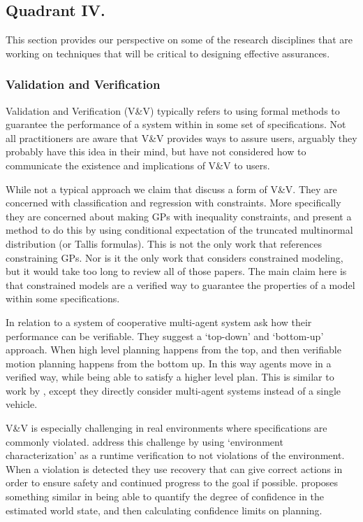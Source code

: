 \subsection{Quadrant IV.}\label{sec:q4}
This section provides our perspective on some of the research disciplines that are working on techniques that will be critical to designing effective assurances.

\subsubsection{Validation and Verification}
    Validation and Verification (V\&V) typically refers to using formal methods to guarantee the performance of a system within in some set of specifications. Not all practitioners are aware that V\&V provides ways to assure users, arguably they probably have this idea in their mind, but have not considered how to communicate the existence and implications of V\&V to users.

    While not a typical approach we claim that \citet{Da_Veiga2012-gh} discuss a form of V\&V. They are concerned with classification and regression with constraints. More specifically they are concerned about making GPs with inequality constraints, and present a method to do this by using conditional expectation of the truncated multinormal distribution (or Tallis formulas). This is not the only work that references constraining GPs. Nor is it the only work that considers constrained modeling, but it would take too long to review all of those papers. The main claim here is that constrained models are a verified way to guarantee the properties of a model within some specifications.

    In relation to a system of cooperative multi-agent system \citet{Da_Silva2016-qb} ask how their performance can be verifiable. They suggest a `top-down' and `bottom-up' approach. When high level planning happens from the top, and then verifiable motion planning happens from the bottom up. In this way agents move in a verified way, while being able to satisfy a higher level plan. This is similar to work by \citet{Conner2007-uw}, except they directly consider multi-agent systems instead of a single vehicle.

    V\&V is especially challenging in real environments where specifications are commonly violated. \citet{Weng_Wong2014-tj} address this challenge by using `environment characterization' as a runtime verification to not violations of the environment. When a violation is detected they use recovery that can give correct actions in order to ensure safety and continued progress to the goal if possible. \citet{Nishi2016-zq} proposes something similar in being able to quantify the degree of confidence in the estimated world state, and then calculating confidence limits on planning.

